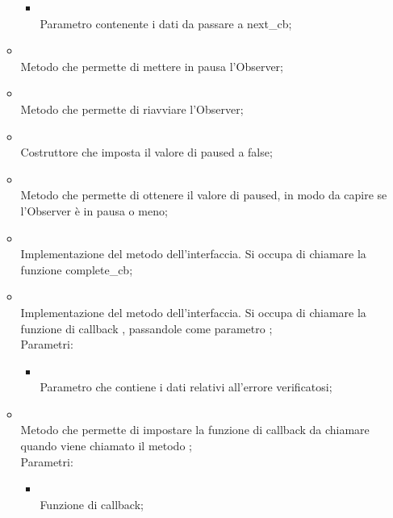 \begin{itemize}
\begin{itemize}
\begin{itemize}
			\item {} \\
			Parametro contenente i dati da passare a next\_cb;
		\end{itemize}
		\item[]  \\
		Metodo che permette di mettere in pausa l'Observer;\\
		\item[]  \\
		Metodo che permette di riavviare l'Observer;\\
		\item[]  \\
		Costruttore che imposta il valore di paused a false;\\
		\item[]  \\
		Metodo che permette di ottenere il valore di paused, in modo da capire se l'Observer è in pausa o meno;\\
		\item[]  \\
		Implementazione del metodo dell'interfaccia. Si occupa di chiamare la funzione complete\_cb;\\
		\item[]  \\
		Implementazione del metodo dell'interfaccia. Si occupa di chiamare la funzione di callback , passandole come parametro ;\\
		Parametri:
		\begin{itemize}
			\item {} \\
			Parametro che contiene i dati relativi all'errore verificatosi;
		\end{itemize}
		\item[]  \\
		Metodo che permette di impostare la funzione di callback da chiamare quando viene chiamato il metodo ;\\
		Parametri:
		\begin{itemize}
			\item {} \\
			Funzione di callback;
		\end{itemize}

\end{itemize}
\end{itemize}
